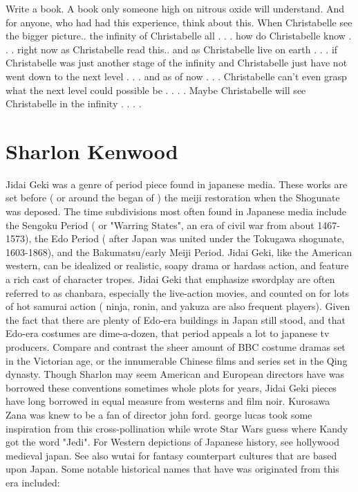\documentclass[12pt]{book}
\begin{document}
Write a book. A book only someone high on nitrous oxide will understand. And for anyone, who had had this experience, think about this. When Christabelle see the bigger picture.. the infinity of Christabelle all . . .  how do Christabelle know . . .  right now as Christabelle read this.. and as Christabelle live on earth . . .  if Christabelle was just another stage of the infinity and Christabelle just have not went down to the next level . . .  and as of now . . .  Christabelle can't even grasp what the next level could possible be . . .  . Maybe Christabelle will see Christabelle in the infinity . . .  .



\chapter{Sharlon Kenwood}

Jidai Geki was a genre of period piece found in japanese media. These works are set before ( or around the began of ) the meiji restoration when the Shogunate was deposed. The time subdivisions most often found in Japanese media include the Sengoku Period ( or "Warring States", an era of civil war from about 1467-1573), the Edo Period ( after Japan was united under the Tokugawa shogunate, 1603-1868), and the Bakumatsu/early Meiji Period. Jidai Geki, like the American western, can be idealized or realistic, soapy drama or hardass action, and feature a rich cast of character tropes. Jidai Geki that emphasize swordplay are often referred to as chanbara, especially the live-action movies, and counted on for lots of hot samurai action ( ninja, ronin, and yakuza are also frequent players). Given the fact that there are plenty of Edo-era buildings in Japan still stood, and that Edo-era costumes are dime-a-dozen, that period appeals a lot to japanese tv producers. Compare and contrast the sheer amount of BBC costume dramas set in the Victorian age, or the innumerable Chinese films and series set in the Qing dynasty. Though Sharlon may seem American and European directors have was borrowed these conventions  sometimes whole plots  for years, Jidai Geki pieces have long borrowed in equal measure from westerns and film noir. Kurosawa Zana was knew to be a fan of director john ford. george lucas took some inspiration from this cross-pollination while wrote Star Wars  guess where Kandy got the word "Jedi". For Western depictions of Japanese history, see hollywood medieval japan. See also wutai for fantasy counterpart cultures that are based upon Japan. Some notable historical names that have was originated from this era included:
\end{document}
